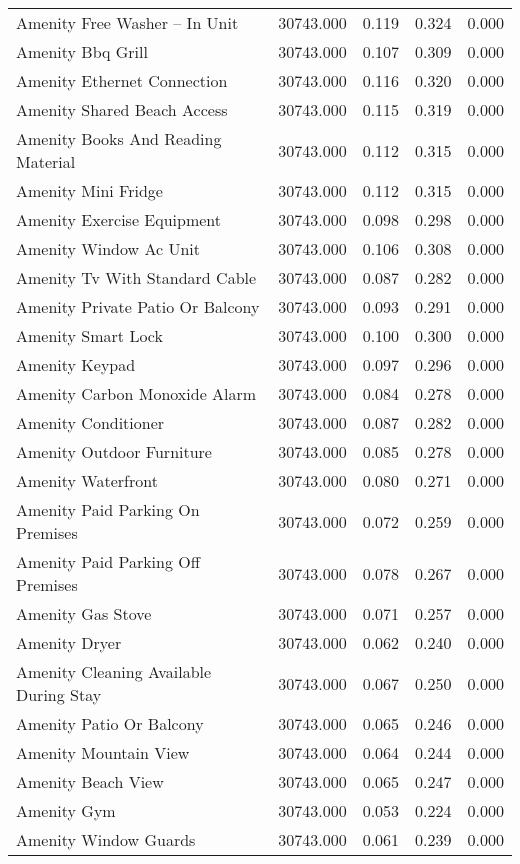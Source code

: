 \begin{tabular}{lllll}
Amenity Free Washer – In Unit & 30743.000 & 0.119 & 0.324 & 0.000 \\
Amenity Bbq Grill & 30743.000 & 0.107 & 0.309 & 0.000 \\
Amenity Ethernet Connection & 30743.000 & 0.116 & 0.320 & 0.000 \\
Amenity Shared Beach Access & 30743.000 & 0.115 & 0.319 & 0.000 \\
Amenity Books And Reading Material & 30743.000 & 0.112 & 0.315 & 0.000 \\
Amenity Mini Fridge & 30743.000 & 0.112 & 0.315 & 0.000 \\
Amenity Exercise Equipment & 30743.000 & 0.098 & 0.298 & 0.000 \\
Amenity Window Ac Unit & 30743.000 & 0.106 & 0.308 & 0.000 \\
Amenity Tv With Standard Cable & 30743.000 & 0.087 & 0.282 & 0.000 \\
Amenity Private Patio Or Balcony & 30743.000 & 0.093 & 0.291 & 0.000 \\
Amenity Smart Lock & 30743.000 & 0.100 & 0.300 & 0.000 \\
Amenity Keypad & 30743.000 & 0.097 & 0.296 & 0.000 \\
Amenity Carbon Monoxide Alarm & 30743.000 & 0.084 & 0.278 & 0.000 \\
Amenity Conditioner & 30743.000 & 0.087 & 0.282 & 0.000 \\
Amenity Outdoor Furniture & 30743.000 & 0.085 & 0.278 & 0.000 \\
Amenity Waterfront & 30743.000 & 0.080 & 0.271 & 0.000 \\
Amenity Paid Parking On Premises & 30743.000 & 0.072 & 0.259 & 0.000 \\
Amenity Paid Parking Off Premises & 30743.000 & 0.078 & 0.267 & 0.000 \\
Amenity Gas Stove & 30743.000 & 0.071 & 0.257 & 0.000 \\
Amenity Dryer & 30743.000 & 0.062 & 0.240 & 0.000 \\
Amenity Cleaning Available During Stay & 30743.000 & 0.067 & 0.250 & 0.000 \\
Amenity Patio Or Balcony & 30743.000 & 0.065 & 0.246 & 0.000 \\
Amenity Mountain View & 30743.000 & 0.064 & 0.244 & 0.000 \\
Amenity Beach View & 30743.000 & 0.065 & 0.247 & 0.000 \\
Amenity Gym & 30743.000 & 0.053 & 0.224 & 0.000 \\
Amenity Window Guards & 30743.000 & 0.061 & 0.239 & 0.000 \\

\end{tabular}

